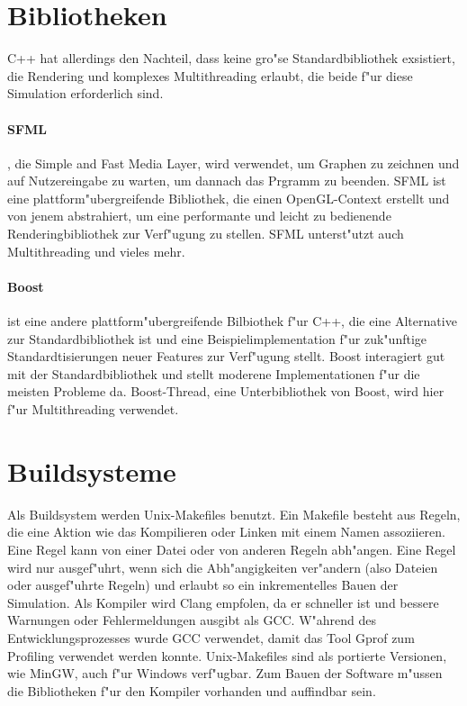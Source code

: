 \documentclass[14pt, a4paper]{report}
\begin{document}
\section{Bibliotheken}
C++ hat allerdings den Nachteil, dass keine gro"se Standardbibliothek exsistiert, 
die Rendering
und komplexes Multithreading erlaubt, die beide f"ur diese Simulation erforderlich 
sind. 

\paragraph{SFML}, die Simple and Fast Media Layer, wird verwendet, um Graphen zu 
zeichnen und auf Nutzereingabe zu warten, um dannach das Prgramm zu beenden. SFML
ist eine plattform"ubergreifende Bibliothek, die einen OpenGL-Context erstellt und von
jenem abstrahiert, um eine performante und leicht zu bedienende Renderingbibliothek zur
Verf"ugung zu stellen. SFML unterst"utzt auch Multithreading und vieles mehr.

\paragraph{Boost} ist eine andere plattform"ubergreifende Bilbiothek f"ur C++, die eine
Alternative zur Standardbibliothek ist und eine Beispielimplementation f"ur zuk"unftige 
Standardtisierungen neuer Features zur Verf"ugung stellt. Boost interagiert gut mit der 
Standardbibliothek und stellt moderene Implementationen f"ur
die meisten Probleme da. Boost-Thread, eine Unterbibliothek von Boost,
wird hier f"ur Multithreading verwendet.

\section{Buildsysteme}
Als Buildsystem werden Unix-Makefiles benutzt. Ein Makefile besteht aus Regeln, die eine
Aktion wie das Kompilieren oder Linken mit einem Namen assoziieren. Eine Regel kann von
einer Datei oder von anderen Regeln abh"angen. Eine Regel wird nur ausgef"uhrt, wenn 
sich die Abh"angigkeiten ver"andern (also Dateien oder ausgef"uhrte Regeln) und erlaubt
so ein inkrementelles Bauen
der Simulation. Als Kompiler wird Clang empfolen, da er schneller ist und bessere
Warnungen oder Fehlermeldungen ausgibt als GCC. W"ahrend des Entwicklungsprozesses 
wurde GCC verwendet, damit das Tool Gprof zum Profiling verwendet werden konnte.
Unix-Makefiles sind als portierte Versionen, wie MinGW, auch f"ur Windows verf"ugbar. 
Zum Bauen
der Software m"ussen die Bibliotheken f"ur den Kompiler vorhanden und auffindbar sein.
\end{document}
